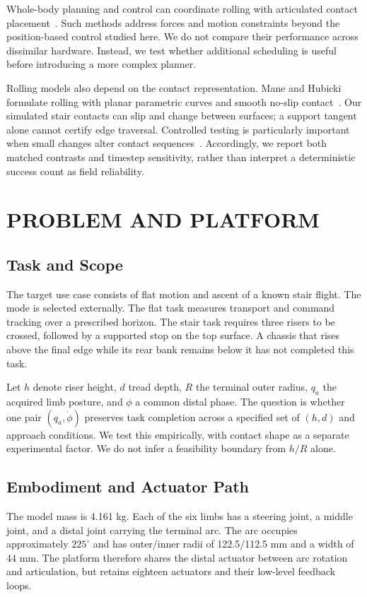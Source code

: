 \documentclass[letterpaper,10pt,conference]{ieeeconf}
\begin{document}
Whole-body planning and control can coordinate rolling with articulated contact placement~\cite{bjelonic2019keep,bjelonic2021wholebody}. Such methods address forces and motion constraints beyond the position-based control studied here. We do not compare their performance across dissimilar hardware. Instead, we test whether additional scheduling is useful before introducing a more complex planner.

Rolling models also depend on the contact representation. Mane and Hubicki formulate rolling with planar parametric curves and smooth no-slip contact~\cite{mane2024rolling}. Our simulated stair contacts can slip and change between surfaces; a support tangent alone cannot certify edge traversal. Controlled testing is particularly important when small changes alter contact sequences~\cite{weng2024testing}. Accordingly, we report both matched contrasts and timestep sensitivity, rather than interpret a deterministic success count as field reliability.

\section{PROBLEM AND PLATFORM}
\subsection{Task and Scope}
The target use case consists of flat motion and ascent of a known stair flight. The mode is selected externally. The flat task measures transport and command tracking over a prescribed horizon. The stair task requires three risers to be crossed, followed by a supported stop on the top surface. A chassis that rises above the final edge while its rear bank remains below it has not completed this task.

Let $h$ denote riser height, $d$ tread depth, $R$ the terminal outer radius, $q_a$ the acquired limb posture, and $\phi$ a common distal phase. The question is whether one pair $(q_a,\dot\phi)$ preserves task completion across a specified set of $(h,d)$ and approach conditions. We test this empirically, with contact shape as a separate experimental factor. We do not infer a feasibility boundary from $h/R$ alone.

\subsection{Embodiment and Actuator Path}
The model mass is 4.161 kg. Each of the six limbs has a steering joint, a middle joint, and a distal joint carrying the terminal arc. The arc occupies approximately $225^\circ$ and has outer/inner radii of 122.5/112.5 mm and a width of 44 mm. The platform therefore shares the distal actuator between arc rotation and articulation, but retains eighteen actuators and their low-level feedback loops.
\end{document}
